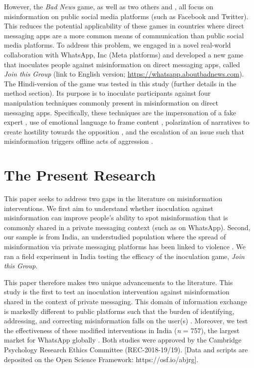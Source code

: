\documentclass[empirical, authordate]{jote-new-article}
\begin{document}
However, the \emph{Bad News }game, as well as two others \parencite[\emph{Harmony Square}][]{Roozenbeek2020} and \parencite[\emph{Go Viral!}][]{Basol2021}, all focus on misinformation on public social media platforms (such as Facebook and Twitter). This reduces the potential applicability of these games in countries where direct messaging apps are a more common means of communication than public social media platforms. To address this problem, we engaged in a novel real-world collaboration with \mbox{WhatsApp}, Inc (Meta platforms) and developed a new game that inoculates people against misinformation on direct messaging apps, called \emph{Join this Group }(link to English version; \url{https://whatsapp.aboutbadnews.com}). The Hindi-version of the game was tested in this study (further details in the method section). Its purpose is to inoculate participants against four manipulation techniques commonly present in misinformation on direct messaging apps. Specifically, these techniques are the impersonation of a fake expert \parencite{Goga2015, Jung2011, Reznik2013}, use of emotional language to frame content \parencite{Gross2004, Konijn2012, Zollo2015}, polarization of narratives to create hostility towards the opposition \parencite{Groenendyk2018, Iyengar2018}, and the escalation of an issue such that misinformation triggers offline acts of aggression \parencite{BBCMonitoring2021, Robb2021}.



\section{The Present Research}

This paper seeks to address two gaps in the literature on misinformation interventions. We first aim to understand whether inoculation against misinformation can improve people's ability to spot misinformation that is commonly shared in a private messaging context (such as on \mbox{WhatsApp}). Second, our sample is from India, an understudied population where the spread of misinformation via private messaging platforms has been linked to violence \parencite{McLaughlin2018}. We ran a field experiment in India testing the efficacy of the inoculation game, \emph{Join this Group}.\textbf{ }

This paper therefore makes two unique advancements to the literature. This study is the first to test an inoculation intervention against misinformation shared in the context of private messaging. This domain of information exchange is markedly different to public platforms such that the burden of identifying, addressing, and correcting misinformation falls on the user(s) \parencite{Pasquetto2020}. Moreover, we test the effectiveness of these modified interventions in India (\emph{n} = 757), the largest market for \mbox{WhatsApp} globally \parencite{Findlay2019}. Both studies were approved by the Cambridge Psychology Research Ethics Committee (REC-2018-19/19). [Data and scripts are deposited on the Open Science Framework: https://osf.io/abjrg].
\end{document}
